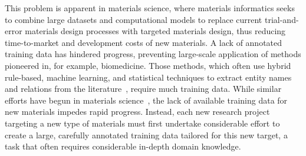 
This problem is apparent in materials science, where materials informatics 
seeks to combine large datasets and computational models to 
replace current trial-and-error materials design processes with targeted materials design, 
thus reducing time-to-market and development costs of new materials.
A lack of annotated training data has hindered progress,
preventing large-scale application of methods pioneered in, for example,
biomedicine.
Those methods, which often use hybrid rule-based, machine learning, and statistical techniques to extract entity names and relations from the literature~\cite{leaman2008banner,zeng2015survey}, require much training data.
While similar efforts have begun in materials science~\cite{hawizy2011chemicaltagger,rocktaschel2012chemspot,leaman2015tmchem,swain2016chemdataextractor,young2018data}, the lack of available training data for new materials impedes rapid progress. 
Instead, each new research project targeting a new type of materials must first undertake considerable
effort to create a large, carefully annotated training
data tailored for this new target, a task that often requires considerable in-depth domain knowledge.

